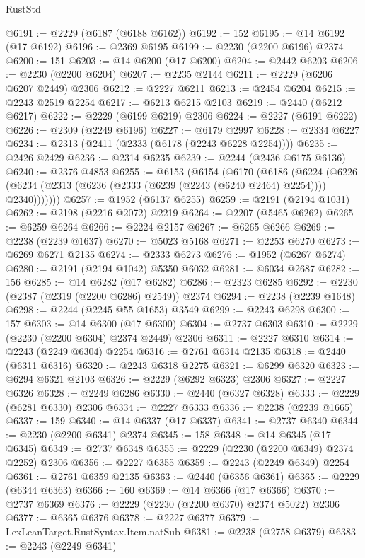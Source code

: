 \begin{lexlean}{RustStd}
\begin{coremodule}
@6191 := @2229 (@6187 (@6188 @6162))
@6192 := 152
@6195 := @14 @6192 (@17 @6192)
@6196 := @2369 @6195
@6199 := @2230 (@2200 @6196) @2374
@6200 := 151
@6203 := @14 @6200 (@17 @6200)
@6204 := @2442 @6203
@6206 := @2230 (@2200 @6204)
@6207 := @2235 @2144
@6211 := @2229 (@6206 @6207 @2449) @2306
@6212 := @2227 @6211
@6213 := @2454 @6204
@6215 := @2243 @2519 @2254
@6217 := @6213 @6215 @2103
@6219 := @2440 (@6212 @6217)
@6222 := @2229 (@6199 @6219) @2306
@6224 := @2227 (@6191 @6222)
@6226 := @2309 (@2249 @6196)
@6227 := @6179 @2997
@6228 := @2334 @6227
@6234 := @2313 (@2411 (@2333 (@6178 (@2243 @6228 @2254))))
@6235 := @2426 @2429
@6236 := @2314 @6235
@6239 := @2244 (@2436 @6175 @6136)
@6240 := @2376 @4853
@6255 := @6153
    (@6154
      (@6170
        (@6186
          (@6224
            (@6226 (@6234 (@2313 (@6236 (@2333 (@6239 (@2243 (@6240 @2464) @2254)))) @2340)))))))
@6257 := @1952 (@6137 @6255)
@6259 := @2191 (@2194 @1031)
@6262 := @2198 (@2216 @2072) @2219
@6264 := @2207 (@5465 @6262)
@6265 := @6259 @6264
@6266 := @2224 @2157
@6267 := @6265 @6266
@6269 := @2238 (@2239 @1637)
@6270 := @5023 @5168
@6271 := @2253 @6270
@6273 := @6269 @6271 @2135
@6274 := @2333 @6273
@6276 := @1952 (@6267 @6274)
@6280 := @2191 (@2194 @1042) @5350 @6032
@6281 := @6034 @2687
@6282 := 156
@6285 := @14 @6282 (@17 @6282)
@6286 := @2323 @6285
@6292 := @2230 (@2387 (@2319 (@2200 @6286) @2549)) @2374
@6294 := @2238 (@2239 @1648)
@6298 := @2244 (@2245 @55 @1653) @3549
@6299 := @2243 @6298
@6300 := 157
@6303 := @14 @6300 (@17 @6300)
@6304 := @2737 @6303
@6310 := @2229 (@2230 (@2200 @6304) @2374 @2449) @2306
@6311 := @2227 @6310
@6314 := @2243 (@2249 @6304) @2254
@6316 := @2761 @6314 @2135
@6318 := @2440 (@6311 @6316)
@6320 := @2243 @6318 @2275
@6321 := @6299 @6320
@6323 := @6294 @6321 @2103
@6326 := @2229 (@6292 @6323) @2306
@6327 := @2227 @6326
@6328 := @2249 @6286
@6330 := @2440 (@6327 @6328)
@6333 := @2229 (@6281 @6330) @2306
@6334 := @2227 @6333
@6336 := @2238 (@2239 @1665)
@6337 := 159
@6340 := @14 @6337 (@17 @6337)
@6341 := @2737 @6340
@6344 := @2230 (@2200 @6341) @2374
@6345 := 158
@6348 := @14 @6345 (@17 @6345)
@6349 := @2737 @6348
@6355 := @2229 (@2230 (@2200 @6349) @2374 @2252) @2306
@6356 := @2227 @6355
@6359 := @2243 (@2249 @6349) @2254
@6361 := @2761 @6359 @2135
@6363 := @2440 (@6356 @6361)
@6365 := @2229 (@6344 @6363)
@6366 := 160
@6369 := @14 @6366 (@17 @6366)
@6370 := @2737 @6369
@6376 := @2229 (@2230 (@2200 @6370) @2374 @5022) @2306
@6377 := @6365 @6376
@6378 := @2227 @6377
@6379 := LexLeanTarget.RustSyntax.Item.natSub
@6381 := @2238 (@2758 @6379)
@6383 := @2243 (@2249 @6341)

\end{coremodule}
\end{lexlean}
